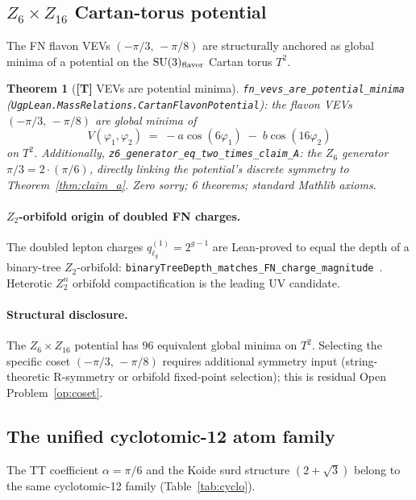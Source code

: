 \documentclass[11pt]{article}
\newtheorem{theorem}{Theorem}[section]
\theoremstyle{remark}
\newcommand{\lean}[1]{\texttt{\small#1}}
\begin{document}
\subsection{$Z_6\times Z_{16}$ Cartan-torus potential}
\label{sec:cartan}

The FN flavon VEVs $(-\pi/3,\,-\pi/8)$ are structurally anchored as global
minima of a potential on the $\mathrm{SU}(3)_{\rm flavor}$ Cartan torus $T^2$.

\begin{tcolorbox}[claimA]
\begin{theorem}[\textbf{[T]} VEVs are potential minima]
\label{thm:cartan}
\lean{fn\_vevs\_are\_potential\_minima}
(\lean{UgpLean.MassRelations.CartanFlavonPotential}):
the flavon VEVs $(-\pi/3,\,-\pi/8)$ are global minima of
\[
  V(\varphi_1,\varphi_2) \;=\; -a\cos(6\varphi_1) \;-\; b\cos(16\varphi_2)
\]
on $T^2$.  Additionally, \lean{z6\_generator\_eq\_two\_times\_claim\_A}:
the $Z_6$ generator $\pi/3 = 2\cdot(\pi/6)$, directly linking the potential's
discrete symmetry to Theorem~\ref{thm:claim_a}.
Zero sorry; 6 theorems; standard Mathlib axioms.
\end{theorem}
\end{tcolorbox}

\paragraph{$Z_2$-orbifold origin of doubled FN charges.}
The doubled lepton charges $q_{\ell_g}^{(1)} = 2^{g-1}$ are Lean-proved to equal
the depth of a binary-tree $Z_2$-orbifold:
\lean{binaryTreeDepth\_matches\_FN\_charge\_magnitude}~\cite{ugp-lean}.
Heterotic $Z_2^n$ orbifold compactification is the leading UV candidate.

\paragraph{Structural disclosure.}
The $Z_6\times Z_{16}$ potential has 96 equivalent global minima on $T^2$.
Selecting the specific coset $(-\pi/3,\,-\pi/8)$ requires additional symmetry
input (string-theoretic R-symmetry or orbifold fixed-point selection); this
is residual Open Problem~\ref{op:coset}.

\subsection{The unified cyclotomic-12 atom family}
\label{sec:cyclotomic_family}

The TT coefficient $\alpha=\pi/6$ and the Koide surd structure $(2+\sqrt{3})$
belong to the same cyclotomic-12 family (Table~\ref{tab:cyclo}).
\end{document}
